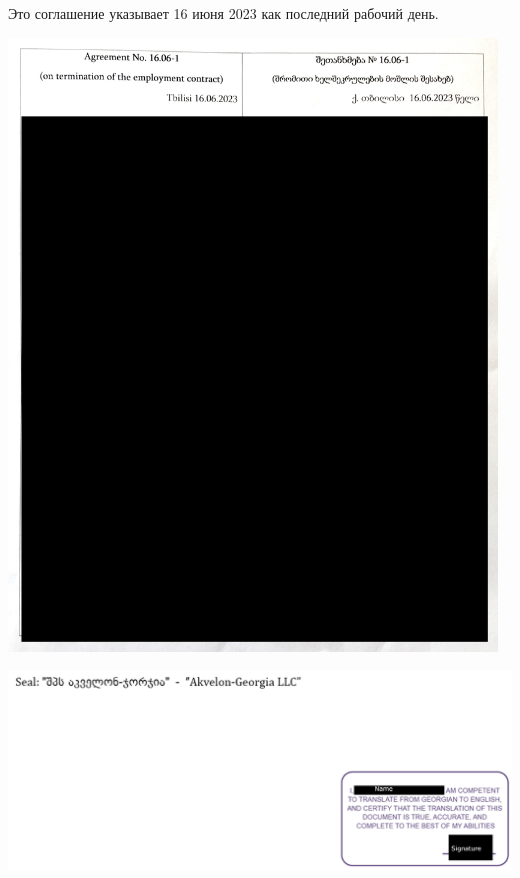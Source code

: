 
Это соглашение указывает 16 июня 2023 как последний рабочий день.

\begin{center}
    \includegraphics[width=35em]{termination-agreement_public}
\end{center}
\pagebreak

\includegraphics[width=\textwidth]{termination-agreement_tr_public}

\pagebreak
